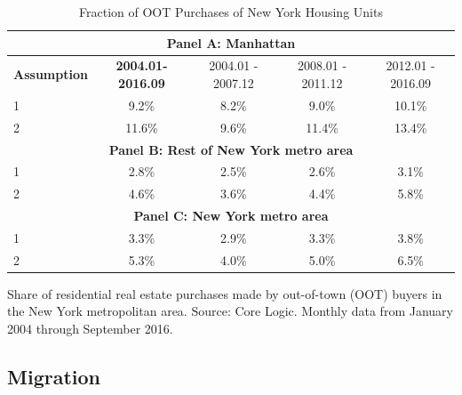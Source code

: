 \documentclass[letterpaper,12pt,dvipsnames,usenames]{article}
\theoremstyle{definition}
\begin{document}
\begin{spacing}{1.0}
\begin{small}
\begin{table}[htbp]
  \caption{Fraction of OOT Purchases of New York Housing Units}
\setlength{\tabcolsep}{4pt}
\renewcommand{\arraystretch}{1.05}
\begin{center}
{\scriptsize
    \begin{tabular}{|l|c|ccc|}
    \hline
    \multicolumn{5}{|c|}{\textbf{Panel A: Manhattan}} \\     \hline
    \textbf{Assumption} & \textbf{2004.01-2016.09} & \multicolumn{1}{c}{2004.01 - 2007.12} & \multicolumn{1}{c}{2008.01 - 2011.12} & 2012.01 - 2016.09  \\    \hline
     1 & 9.2\%  & 8.2\% & 9.0\% & 10.1\%  \\
     2 & 11.6\% & 9.6\% & 11.4\% & 13.4\%  \\     \hline
    \multicolumn{5}{|c|}{\textbf{Panel B: Rest of New York metro area}} \\     \hline
     1 & 2.8\%  & 2.5\% & 2.6\% & 3.1\%  \\
     2 & 4.6\%  & 3.6\% & 4.4\% & 5.8\%  \\
         \hline
    \multicolumn{5}{|c|}{\textbf{Panel C: New York metro area}} \\     \hline
     1 & 3.3\%  & 2.9\% & 3.3\% & 3.8\%  \\
     2 & 5.3\%  & 4.0\% & 5.0\% & 6.5\%  \\
         \hline
        \end{tabular}
}
\end{center}
\begin{minipage}{\textwidth}\tiny
     Share of  residential real estate purchases made by out-of-town (OOT) buyers in the New York metropolitan area. Source: Core Logic. Monthly data from January 2004 through September 2016.
    \end{minipage}
  \label{tab:OOTNYdata}%
\end{table}%

\subsection{Migration} \label{app:dataNYC_migration}


\end{small}
\end{spacing}
\end{document}
